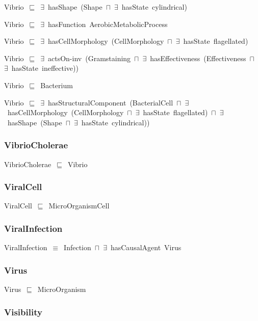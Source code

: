 \documentclass{article}
\begin{document}
Vibrio~\ensuremath{\sqsubseteq}~\ensuremath{\exists}~hasShape~(Shape~\ensuremath{\sqcap}~\ensuremath{\exists}~hasState~cylindrical)~

Vibrio~\ensuremath{\sqsubseteq}~\ensuremath{\exists}~hasFunction~AerobicMetabolicProcess~

Vibrio~\ensuremath{\sqsubseteq}~\ensuremath{\exists}~hasCellMorphology~(CellMorphology~\ensuremath{\sqcap}~\ensuremath{\exists}~hasState~flagellated)~

Vibrio~\ensuremath{\sqsubseteq}~\ensuremath{\exists}~actsOn-inv~(Gramstaining~\ensuremath{\sqcap}~\ensuremath{\exists}~hasEffectiveness~(Effectiveness~\ensuremath{\sqcap}~\ensuremath{\exists}~hasState~ineffective))~

Vibrio~\ensuremath{\sqsubseteq}~Bacterium~

Vibrio~\ensuremath{\sqsubseteq}~\ensuremath{\exists}~hasStructuralComponent~(BacterialCell~\ensuremath{\sqcap}~\ensuremath{\exists}~hasCellMorphology~(CellMorphology~\ensuremath{\sqcap}~\ensuremath{\exists}~hasState~flagellated)~\ensuremath{\sqcap}~\ensuremath{\exists}~hasShape~(Shape~\ensuremath{\sqcap}~\ensuremath{\exists}~hasState~cylindrical))~

\subsubsection*{VibrioCholerae}

VibrioCholerae~\ensuremath{\sqsubseteq}~Vibrio~

\subsubsection*{ViralCell}

ViralCell~\ensuremath{\sqsubseteq}~MicroOrganismCell~

\subsubsection*{ViralInfection}

ViralInfection~\ensuremath{\equiv}~Infection~\ensuremath{\sqcap}~\ensuremath{\exists}~hasCausalAgent~Virus

\subsubsection*{Virus}

Virus~\ensuremath{\sqsubseteq}~MicroOrganism~

\subsubsection*{Visibility}
\end{document}
